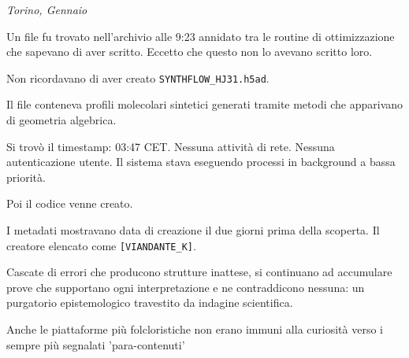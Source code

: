 \begin{archivefragment}
\textit{Torino, Gennaio}

Un file fu trovato nell'archivio alle 9:23 annidato tra le routine di ottimizzazione che sapevano di aver scritto. Eccetto che questo non lo avevano scritto loro.

Non ricordavano di aver creato \texttt{SYNTHFLOW\_HJ31.h5ad}.

Il file conteneva profili molecolari sintetici generati tramite metodi che apparivano di geometria algebrica. 

Si trovò il timestamp: 03:47 CET. Nessuna attività di rete. Nessuna autenticazione utente. Il sistema stava eseguendo processi in background a bassa priorità. 

Poi il codice venne creato.

I metadati mostravano data di creazione il due giorni prima della scoperta. Il creatore elencato come \texttt{[VIANDANTE\_K]}.

\end{archivefragment}

Cascate di errori che producono strutture inattese, si continuano ad accumulare prove che supportano ogni interpretazione e ne contraddicono nessuna: un purgatorio epistemologico travestito da indagine scientifica.

Anche le piattaforme più folcloristiche non erano immuni alla curiosità verso i sempre più segnalati 'para-contenuti'

